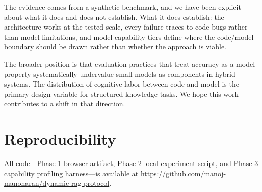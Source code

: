 \documentclass[11pt,a4paper]{article}
\begin{document}
The evidence comes from a synthetic benchmark, and we have been explicit about what it does and does not establish. What it does establish: the architecture works at the tested scale, every failure traces to code bugs rather than model limitations, and model capability tiers define where the code/model boundary should be drawn rather than whether the approach is viable.

The broader position is that evaluation practices that treat accuracy as a model property systematically undervalue small models as components in hybrid systems. The distribution of cognitive labor between code and model is the primary design variable for structured knowledge tasks. We hope this work contributes to a shift in that direction.

\section*{Reproducibility}

All code---Phase 1 browser artifact, Phase 2 local experiment script, and Phase 3 capability profiling harness---is available at \url{https://github.com/manoj-manoharan/dynamic-rag-protocol}.
\end{document}
